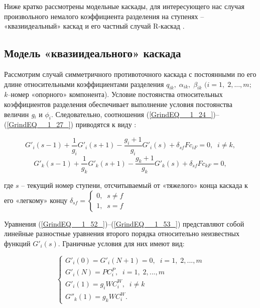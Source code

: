 Ниже кратко рассмотрены модельные каскады, для интересующего нас случая произвольного немалого коэффициента разделения на ступенях -- «квазиидеальный» каскад и его частный случай R-каскад \cite{sazykinKvaziidealnyeKaskadyDlya2000}.

\subsection{Модель «квазиидеального» каскада}

Рассмотрим случай симметричного противоточного каскада с постоянными по его длине относительными коэффициентами разделения $q_{ik} ,\; \alpha _{ik} ,\; \beta _{ik} $ $(i=1,\; 2,...,m;$ \textit{k}--номер «опорного» компонента). Условие постоянства относительных коэффициентов разделения обеспечивает выполнение условия постоянства величин \textit{g${}_{i}$} и $\phi _{i} $. Следовательно, соотношения (\ref{GrindEQ__1_24_})--(\ref{GrindEQ__1_27_}) приводятся к виду \cite{sulaberidzeTeoriyaKaskadovDlya2011}:

\begin{equation} \label{GrindEQ__1_52_} 
  G'_{i} (s-1)+\frac{1}{g_{i} } G'_{i} (s+1)-\frac{g_{i} +1}{g_{i} } G'_{i} (s)+\delta _{sf} Fc_{iF} =0,\; \; i\ne k, 
  \end{equation} 
  \begin{equation} \label{GrindEQ__1_53_} 
  G'_{k} (s-1)+\frac{1}{g_{k} } G'_{k} (s+1)-\frac{g_{k} +1}{g_{k} } G'_{k} (s)+\delta _{sf} Fc_{kF} =0, 
  \end{equation}

где $s$ – текущий номер ступени, отсчитываемый от «тяжелого» конца каскада к его «легкому» концу $\delta _{sf} =\left\{\begin{array}{l} {0,\; \; s\ne f} \\ {1,\; \; s=f} \end{array}\right. $

Уравнения (\ref{GrindEQ__1_52_})--(\ref{GrindEQ__1_53_}) представляют собой линейные разностные уравнения второго порядка относительно неизвестных функций $G'_{i} (s)$. Граничные условия для них имеют вид:

\begin{equation} \label{GrindEQ__1_54_} 
  \left\{\begin{array}{l} {G'_{i} (0)=G'_{i} (N+1)=0,\; \; i=1,\; 2,...,m} \\ {G'_{i} (N)=PC_{i}^{P} ,\; \; i=1,\; 2,...,m} \\ {G'_{i} (1)=g_{i} WC_{i}^{W} ,\; \; i\ne k} \\ {G''_{k} (1)=g_{k} WC_{i}^{W} .} \end{array}\right.  
\end{equation} 

